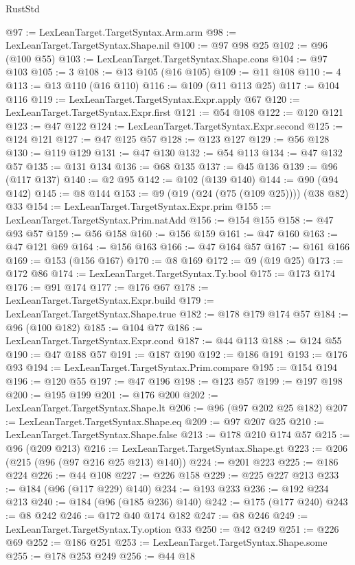 \begin{lexlean}{RustStd}
\begin{coremodule}
@97 := LexLeanTarget.TargetSyntax.Arm.arm
@98 := LexLeanTarget.TargetSyntax.Shape.nil
@100 := @97 @98 @25
@102 := @96 (@100 @55)
@103 := LexLeanTarget.TargetSyntax.Shape.cons
@104 := @97 @103
@105 := 3
@108 := @13 @105 (@16 @105)
@109 := @11 @108
@110 := 4
@113 := @13 @110 (@16 @110)
@116 := @109 (@11 @113 @25)
@117 := @104 @116
@119 := LexLeanTarget.TargetSyntax.Expr.apply @67
@120 := LexLeanTarget.TargetSyntax.Expr.first
@121 := @54 @108
@122 := @120 @121
@123 := @47 @122
@124 := LexLeanTarget.TargetSyntax.Expr.second
@125 := @124 @121
@127 := @47 @125 @57
@128 := @123 @127
@129 := @56 @128
@130 := @119 @129
@131 := @47 @130
@132 := @54 @113
@134 := @47 @132 @57
@135 := @131 @134
@136 := @68 @135
@137 := @45 @136
@139 := @96 (@117 @137)
@140 := @2 @95
@142 := @102 (@139 @140)
@144 := @90 (@94 @142)
@145 := @8 @144
@153 := @9 (@19 (@24 (@75 (@109 @25)))) (@38 @82) @33
@154 := LexLeanTarget.TargetSyntax.Expr.prim
@155 := LexLeanTarget.TargetSyntax.Prim.natAdd
@156 := @154 @155
@158 := @47 @93 @57
@159 := @56 @158
@160 := @156 @159
@161 := @47 @160
@163 := @47 @121 @69
@164 := @156 @163
@166 := @47 @164 @57
@167 := @161 @166
@169 := @153 (@156 @167)
@170 := @8 @169
@172 := @9 (@19 @25)
@173 := @172 @86
@174 := LexLeanTarget.TargetSyntax.Ty.bool
@175 := @173 @174
@176 := @91 @174
@177 := @176 @67
@178 := LexLeanTarget.TargetSyntax.Expr.build
@179 := LexLeanTarget.TargetSyntax.Shape.true
@182 := @178 @179 @174 @57
@184 := @96 (@100 @182)
@185 := @104 @77
@186 := LexLeanTarget.TargetSyntax.Expr.cond
@187 := @44 @113
@188 := @124 @55
@190 := @47 @188 @57
@191 := @187 @190
@192 := @186 @191
@193 := @176 @93
@194 := LexLeanTarget.TargetSyntax.Prim.compare
@195 := @154 @194
@196 := @120 @55
@197 := @47 @196
@198 := @123 @57
@199 := @197 @198
@200 := @195 @199
@201 := @176 @200
@202 := LexLeanTarget.TargetSyntax.Shape.lt
@206 := @96 (@97 @202 @25 @182)
@207 := LexLeanTarget.TargetSyntax.Shape.eq
@209 := @97 @207 @25
@210 := LexLeanTarget.TargetSyntax.Shape.false
@213 := @178 @210 @174 @57
@215 := @96 (@209 @213)
@216 := LexLeanTarget.TargetSyntax.Shape.gt
@223 := @206 (@215 (@96 (@97 @216 @25 @213) @140))
@224 := @201 @223
@225 := @186 @224
@226 := @44 @108
@227 := @226 @158
@229 := @225 @227 @213
@233 := @184 (@96 (@117 @229) @140)
@234 := @193 @233
@236 := @192 @234 @213
@240 := @184 (@96 (@185 @236) @140)
@242 := @175 (@177 @240)
@243 := @8 @242
@246 := @172 @40 @174 @182
@247 := @8 @246
@249 := LexLeanTarget.TargetSyntax.Ty.option @33
@250 := @42 @249
@251 := @226 @69
@252 := @186 @251
@253 := LexLeanTarget.TargetSyntax.Shape.some
@255 := @178 @253 @249
@256 := @44 @18

\end{coremodule}
\end{lexlean}
